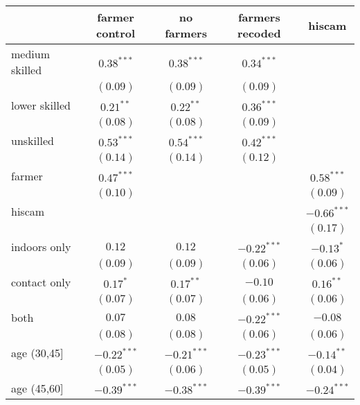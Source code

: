 
\begin{table}
\begin{center}
\begin{tabular}{l c c c c}
\hline
 & farmer control & no farmers & farmers recoded & hiscam \\
\hline
medium skilled & $0.38^{***}$  & $0.38^{***}$  & $0.34^{***}$  &               \\
               & $(0.09)$      & $(0.09)$      & $(0.09)$      &               \\
lower skilled  & $0.21^{**}$   & $0.22^{**}$   & $0.36^{***}$  &               \\
               & $(0.08)$      & $(0.08)$      & $(0.09)$      &               \\
unskilled      & $0.53^{***}$  & $0.54^{***}$  & $0.42^{***}$  &               \\
               & $(0.14)$      & $(0.14)$      & $(0.12)$      &               \\
farmer         & $0.47^{***}$  &               &               & $0.58^{***}$  \\
               & $(0.10)$      &               &               & $(0.09)$      \\
hiscam         &               &               &               & $-0.66^{***}$ \\
               &               &               &               & $(0.17)$      \\
indoors only   & $0.12$        & $0.12$        & $-0.22^{***}$ & $-0.13^{*}$   \\
               & $(0.09)$      & $(0.09)$      & $(0.06)$      & $(0.06)$      \\
contact only   & $0.17^{*}$    & $0.17^{**}$   & $-0.10$       & $0.16^{**}$   \\
               & $(0.07)$      & $(0.07)$      & $(0.06)$      & $(0.06)$      \\
both           & $0.07$        & $0.08$        & $-0.22^{***}$ & $-0.08$       \\
               & $(0.08)$      & $(0.08)$      & $(0.06)$      & $(0.06)$      \\
age (30,45]    & $-0.22^{***}$ & $-0.21^{***}$ & $-0.23^{***}$ & $-0.14^{**}$  \\
               & $(0.05)$      & $(0.06)$      & $(0.05)$      & $(0.04)$      \\
age (45,60]    & $-0.39^{***}$ & $-0.38^{***}$ & $-0.39^{***}$ & $-0.24^{***}$ \\

\end{tabular}
\end{center}
\end{table}
